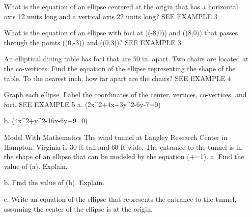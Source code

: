\documentclass{article}
\newenvironment{practice}[2]{}{}        %
\newcommand{\answer}[1]{}               %
\newcommand{\placeholder}[2]{}          %
\newcommand{\te}[1]{}                   %
\begin{document}
\begin{practice}{20}{1}
What is the equation of an ellipse centered at the origin that has a horizontal axis 12 units long and a vertical axis 22 units long? SEE EXAMPLE 3
\answer{(\frac{x^2}{36}+\frac{y^2}{121}=1)}
\end{practice}
\begin{practice}{21}{1}
What is the equation of an ellipse with foci at ((-8,0)) and ((8,0)) that passes through the points ((0,-3)) and ((0,3))? SEE EXAMPLE 3
\answer{(\frac{x^2}{73}+\frac{y^2}{9}=1)}
\end{practice}
\begin{practice}{22}{1}
An elliptical dining table has foci that are 50 in. apart. Two chairs are located at the co-vertices. Find the equation of the ellipse representing the shape of the table. To the nearest inch, how far apart are the chairs? SEE EXAMPLE 4
\placeholder{diagram}{Wooden horizontal oval dining table; red horizontal diameter labeled 70 in. Chairs drawn at the left and right vertices.}
\answer{(\frac{x^2}{1225}+\frac{y^2}{600}=1); about 49 in.}
\te{Chairs are drawn at the vertices, although the prompt and key use co-vertices.}
\end{practice}
\begin{practice}{23}{1}
Graph each ellipse. Label the coordinates of the center, vertices, co-vertices, and foci. SEE EXAMPLE 5
a. (2x^2+4x+3y^2-6y-7=0)
\answer{See graph; center ((-1,1)), vertices ((-1\pm\sqrt{6},1)), co-vertices ((-1,3)), ((-1,-1)), foci ((-1\pm\sqrt{2},1)).}
\placeholder{graph}{Unit grid [-5,5] both axes, black x/y axes, O origin; x labels +/-2,+/-4, y -4,2,4. Red horizontal ellipse, all key points filled and labeled: center (-1,1), vertices (-1+sqrt6,1),(-1-sqrt6,1), co-vertices (-1,3),(-1,-1), foci (-1+sqrt2,1),(-1-sqrt2,1).}
b. (4x^2+y^2-16x-6y+9=0)
\answer{See graph; center ((2,3)), vertices ((2,7)), ((2,-1)), co-vertices ((0,3)), ((4,3)), foci ((2,3\pm2\sqrt{3})).}
\placeholder{graph}{Unit grid x [-3,7], y [-2,8], black x/y axes, O origin, x labels 4,6; y 2,4,6. Red vertical ellipse, filled labeled center (2,3), vertices (2,7),(2,-1), co-vertices (0,3),(4,3), foci (2,3+2sqrt3),(2,3-2sqrt3).}
\end{practice}
\begin{practice}{24}{2}
Model With Mathematics The wind tunnel at Langley Research Center in Hampton, Virginia is 30 ft tall and 60 ft wide. The entrance to the tunnel is in the shape of an ellipse that can be modeled by the equation (+=1).
a. Find the value of (a). Explain.
\answer{The ellipse is horizontal. The major axis is 60 feet long, so (2a=60). Therefore, (a=30) feet.}
b. Find the value of (b). Explain.
\answer{The ellipse is horizontal. The minor axis is 30 feet long, so (2b=30). Therefore, (b=15) feet.}
c. Write an equation of the ellipse that represents the entrance to the tunnel, assuming the center of the ellipse is at the origin.
\answer{(\frac{x^2}{900}+\frac{y^2}{225}=1)}
\te{Printed model omits the square on (y); an ellipse requires (y^2).}
\end{practice}
\end{document}
